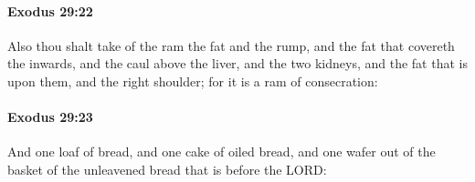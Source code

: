 		\paragraph{Exodus 29:22} %
			\label{EXODUS-29-22}

			Also thou shalt take of the ram the fat and the rump, and the fat that covereth the inwards, and the caul above the liver, and the two kidneys, and the fat that is upon them, and the right shoulder; for it is a ram of consecration:


		\paragraph{Exodus 29:23} %
			\label{EXODUS-29-23}

			And one loaf of bread, and one cake of oiled bread, and one wafer out of the basket of the unleavened bread that is before the LORD:


